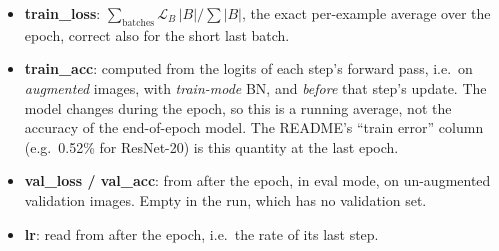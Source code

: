 \begin{center}
\end{center}

\begin{repo}
\begin{itemize}[nosep]
  \item \textbf{train\_loss}: $\sum_\text{batches}\mathcal L_B\,|B|\big/\sum|B|$, the exact per-example average over the epoch, correct also for the short last batch.
  \item \textbf{train\_acc}: computed from the logits of each step's forward pass, i.e.\ on \emph{augmented} images, with \emph{train-mode} BN, and \emph{before} that step's update. The model changes during the epoch, so this is a running average, not the accuracy of the end-of-epoch model. The README's ``train error'' column (e.g.\ 0.52\% for ResNet-20) is this quantity at the last epoch.
  \item \textbf{val\_loss / val\_acc}: from  after the epoch, in eval mode, on un-augmented validation images. Empty in the  run, which has no validation set.
  \item \textbf{lr}: read from  after the epoch, i.e.\ the rate of its last step.
\end{itemize}
\end{repo}

